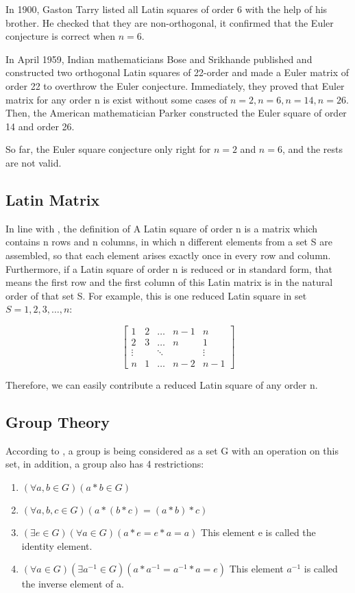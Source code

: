 \documentclass[12pt]{article}
\begin{document}
In 1900, Gaston Tarry listed all Latin squares of order 6 with the help of his brother. He checked that they are non-orthogonal, it confirmed that the Euler conjecture is correct when $n = 6$.

In April 1959, Indian mathematicians Bose and Srikhande published \cite{ref10} and constructed two orthogonal Latin squares of 22-order and made a Euler matrix of order 22 to overthrow the Euler conjecture. Immediately, they proved that Euler matrix for any order n is exist without some cases of $n = 2, n = 6, n = 14, n = 26$. Then, the American mathematician Parker constructed the Euler square of order 14 and order 26.

So far, the Euler square conjecture only right for $n = 2$ and $n = 6$, and the rests are not valid.


\subsection{Latin Matrix}

In line with \cite{ref11}, the definition of A Latin square of order n is a matrix which contains n rows and n columns, in which n different elements from a set S are assembled, so that each element arises exactly once in every row and column. Furthermore, if a Latin square of order n is reduced or in standard form, that means the first row and the first column of this Latin matrix is in the natural order of that set S. For example, this is one reduced Latin square in set $S = {1, 2, 3, …, n}$:


\[ \begin{bmatrix}
1 & 2 & \dots & n-1 & n \\
2 & 3 & \dots & n & 1 \\
\vdots &  & \ddots &  & \vdots \\
n & 1 & \dots & n-2 & n-1 \end{bmatrix} \]


Therefore, we can easily contribute a reduced Latin square of any order n.


\subsection{Group Theory}

According to \cite{ref2}, a group is being considered as a set G with an operation \* on this set, in addition, a group also has 4 restrictions:

\begin{enumerate}[1.]
\item $(\forall a, b \in G) (a \ast b \in G)$
\item $(\forall a, b, c \in G) (a \ast (b \ast c) = (a \ast b) \ast c)$
\item $(\exists e \in G) (\forall a \in G) (a \ast e = e \ast a = a)$ This element e is called the identity element. 
\item $(\forall a \in G) (\exists a^{-1} \in G) (a \ast a^{-1} = a^{-1} \ast a = e)$ This element $a^{-1}$ is called the inverse element of a.
\end{enumerate}
\end{document}
